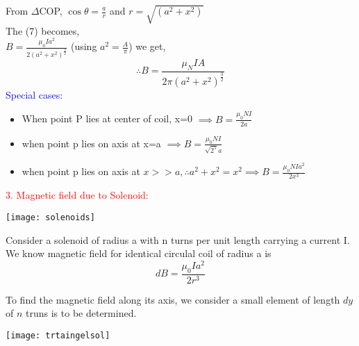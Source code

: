 \documentclass{beamer}
\begin{document}
\begin{frame}
From $\Delta$COP, $\cos\theta=\frac{a}{r}$ and $r=\sqrt{(a^2+x^2)}$ \\
The (7) becomes,\\
\hspace{3cm} $B=\frac{\mu_0 Ia^2}{2(a^2+x^2)^{\frac{3}{2}}} $ \hspace{1cm} (using $a^2=\frac{A}{\pi}$) we get,
\begin{equation}
\therefore  B=\frac{\mu_ NIA}{2\pi(a^2+x^2)^{\frac{3}{2}}}
\end{equation}
\textcolor{blue}{Special cases:}
\begin{itemize}
\item When point P lies at center of coil, x=0 $\implies B=\frac{\mu_0 NI}{2a}$
\item when point p lies on axis at x=a $\implies  B=\frac{\mu_0 NI}{\sqrt{2^5}a}
$
\item when point p lies on axis at $x>>a, \therefore a^2+x^2=x^2 \implies B=\frac{\mu_0 NIa^2}{2x^3}$
\end{itemize}

\textcolor{red}{3. Magnetic field due to Solenoid:}
\begin{center}
\texttt{[image: solenoids]}
\end{center}

\end{frame}

\begin{frame}
Consider a solenoid of radius a with n turns per unit length carrying a current I.\\
We know magnetic field for identical circulal coil of radius a is \\

\begin{equation}
dB=\frac{\mu_0I a^2}{2r^3}
\end{equation}

 To find the magnetic field along its axis, we consider a small element of length $dy$ of  $n$ truns is to be determined.\\
 
 \begin{center}
\texttt{[image: trtaingelsol]}
\end{center}

\end{frame}
\end{document}
